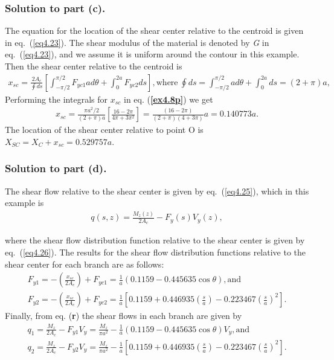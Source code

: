 \documentclass{AeroStructure-ERJohnson}
\begin{document}
\begin{example*}
\vspace*{-10pt}

\subsubsection{Solution to part (c).} The equation for the location of the shear center relative to the centroid is given in eq.~(\ref{eq4.23}). The shear modulus of the material is denoted by \textit{G} in eq.~(\ref{eq4.23}), and we assume it is uniform around the contour in this example. Then the shear center relative to the centroid is
\begin{align}\label{ex4.8p}
x_{s c}=\frac{2 A_{c}}{\oint\! d s}\left[\int_{-\pi/2}^{\pi/2} F_{y c 1} a d \theta+\int_{0}^{2a} F_{y c 2} d s\right], \text{where}\ \oint\! d s=\int_{-\pi/2}^{\pi/2} a d \theta+\int_{0}^{2 a} d s=(2+\pi) a,
\end{align}
Performing the integrals for $x_{s c}$ in eq. (\textbf{\ref{ex4.8p}}) we get
\begin{align}\label{ex4.8q}
x_{s c}=\frac{\pi a^{2}/2}{(2+\pi) a}\left[\frac{16-2 \pi}{4 \pi+3 \pi^{2}}\right]=\frac{(16-2 \pi)}{(2+\pi)(4+3 \pi)} a=0.140773 a.
\end{align}
The location of the shear center relative to point O is $X_{S C}=X_{C}+x_{s c}=0.529757 a$.

\subsubsection{Solution to part (d).} The shear flow relative to the shear center is given by eq.~(\ref{eq4.25}), which in this example is
\begin{align}\label{ex4.8r}
q(s, z)=\frac{M_{z}(z)}{2 A_{c}}-F_{y}(s) V_{y}(z),
\end{align}

\pagebreak

\noindent where the shear flow distribution function relative to the shear center is given by eq.~(\ref{eq4.26}). The results for the shear flow distribution functions relative to the shear center for each branch are as follows:
\begin{gather}\label{ex4.8s}
F_{y 1}=-\left(\frac{x_{s c}}{2 A_{c}}\right)+F_{y c 1}=\frac{1}{a}(0.1159-0.445635 \cos \theta), \text{and}
\\[6pt]
F_{y 2}=-\left(\frac{x_{s c}}{2 A_{c}}\right)+F_{y c 2}=\frac{1}{a}\left[0.1159+0.446935\left(\frac{s}{a}\right)-0.223467\left(\frac{s}{a}\right)^{2}\right].\label{ex4.8t}
\end{gather}
Finally, from eq. (\textbf{r}) the shear flows in each branch are given by
\begin{gather}
q_{1}=\frac{M_{z}}{2 A_{c}}-F_{y 1} V_{y}=\frac{M_{z}}{\pi a^{2}}-\frac{1}{a}(0.1159-0.445635 \cos \theta) V_{y}, \text{and}
\label{ex4.8u}\\[6pt]
q_{2}=\frac{M_{z}}{2 A_{c}}-F_{y 2} V_{y}=\frac{M_{z}}{\pi a^{2}}-\frac{1}{a}\left[0.1159+0.446935\left(\frac{s}{a}\right)-0.223467\left(\frac{s}{a}\right)^{2}\right].\label{ex4.8v}
\end{gather}


\end{example*}
\end{document}

